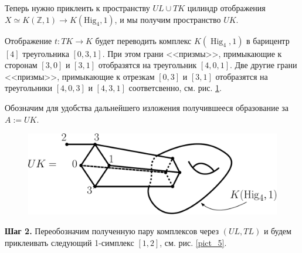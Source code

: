\documentclass[14pt, dvipsnames, twoside]{extarticle}
\theoremstyle{definition}
\theoremstyle{remark}
\DeclareMathOperator{\Hig}{\mathrm{Hig}}
\begin{document}
Теперь нужно приклеить к пространству $UL\cup TK$ цилиндр отображения $X\simeq K(\mathbb{Z}, 1)\to K(\mathrm{Hig}_4, 1)$, и мы получим пространство $UK$. 

Отображение $t: TK\to K$ будет переводить комплекс $K(\Hig_4, 1)$ в барицентр $[4]$ треугольника $[0, 3, 1]$. При этом грани <<призмы>>, примыкающие к сторонам $[3, 0]$ и $[3, 1]$ отобразятся на треугольник $[4, 0, 1]$. Две другие грани <<призмы>>, примыкающие к отрезкам $[0, 3]$ и $[3, 1]$ отобразятся на треугольники $[4, 0, 3]$ и $[4, 3, 1]$ соответсвенно, см. рис. \ref{pict_4}.  

Обозначим для удобства дальнейшего изложения получившееся образование за $A:=UK$. 

\begin{figure}
\begin{center}
\includegraphics[scale=0.7]{pict4}
\caption{}\label{pict_4}
\end{center}
\end{figure}





{\bf Шаг 2.} Переобозначим полученную пару комплексов через $(UL, TL)$ и будем приклеивать следующий 1-симплекс $[1, 2]$, см. рис. \ref{pict_5}.  
\end{document}
